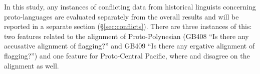 \documentclass[12pt,letterpaper]{article}
\begin{document}
In this study, any instances of conflicting data from historical linguists concerning proto-languages are evaluated separately from the overall results and will be reported in a separate section (§\ref{sec:conflicts}). There are three instances of this: two features related to the alignment of Proto-Polynesian (GB408 ``Is there any accusative alignment of flagging?'' and GB409 ``Is there any ergative alignment of flagging?'') and one feature for Proto-Central Pacific, where \citet{kikusawa2002proto} and \citet{ball2007ergativity} disagree on the alignment as well.



\end{document}

